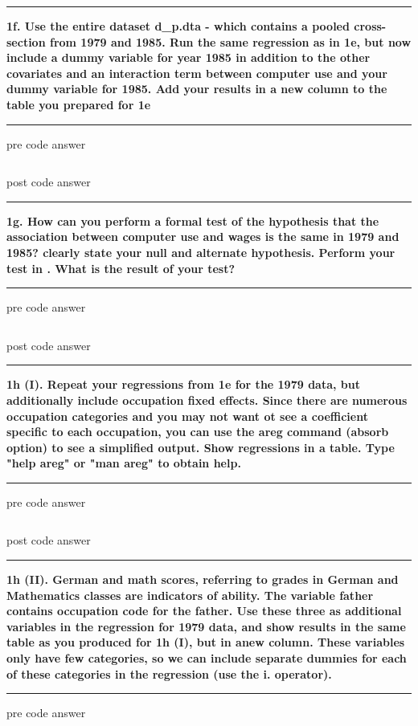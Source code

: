 \documentclass[12pt]{article}
\newcommand\question[1]{\vspace{1em}\hrule\vspace{1em}\textbf{#1}\vspace{1em}\hrule\vspace{1em}}
\begin{document}
\begin{table}
\caption{}

\end{table}

\question{1f. Use the entire dataset d\_p.dta - which contains a pooled cross-section from 1979 and 1985. Run the same regression as in 1e, but now include a dummy variable for year 1985 in addition to the other covariates and an interaction term between computer use and your dummy variable for 1985. Add your results in a new column to the table you prepared for 1e}
pre code answer

\begin{lstlisting}
\end{lstlisting}

post code answer


\question{1g. How can you perform a formal test of the hypothesis that the association between computer use and wages is the same in 1979 and 1985? clearly state your null and alternate hypothesis. Perform your test in \stata. What is the result of your test?}
pre code answer

\begin{lstlisting}
\end{lstlisting}

post code answer

\newpage
\question{1h (I). Repeat your regressions from 1e for the 1979 data, but additionally include occupation fixed effects. Since there are numerous occupation categories and you may not want ot see a coefficient specific to each occupation, you can use the areg command (absorb option) to see a simplified output. Show regressions in a table. Type "help areg" or "man areg" to obtain help.}
pre code answer

\begin{lstlisting}
\end{lstlisting}

post code answer

\newpage
\question{1h (II). German and math scores, referring to grades in German and Mathematics classes are indicators of ability. The variable father contains occupation code for the father. Use these three as additional variables in the regression for 1979 data, and show results in the same table as you produced for 1h (I), but in anew column. These variables only have few categories, so we can include separate dummies for each of these categories in the regression (use the i. operator).}
pre code answer

\begin{lstlisting}
\end{lstlisting}
\end{document}
